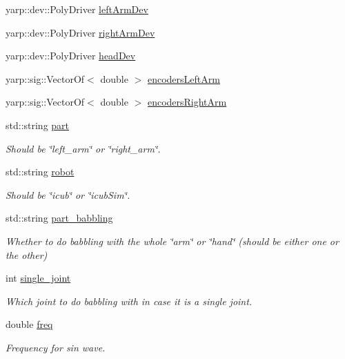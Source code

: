 \begin{DoxyCompactItemize}
\item 
yarp\+::dev\+::\+Poly\+Driver \hyperlink{group__babbling_aa52eea3bfd656e48ed01bce7a7cd9da8}{left\+Arm\+Dev}
\item 
yarp\+::dev\+::\+Poly\+Driver \hyperlink{group__babbling_ab35573fbefffff68d2816c4ce405a0a4}{right\+Arm\+Dev}
\item 
yarp\+::dev\+::\+Poly\+Driver \hyperlink{group__babbling_a1428fa9c9e68fada5155fc79fc7af6dd}{head\+Dev}
\item 
yarp\+::sig\+::\+Vector\+Of$<$ double $>$ \hyperlink{group__babbling_a9ef28388394d078d6578764a6435017c}{encoders\+Left\+Arm}
\item 
yarp\+::sig\+::\+Vector\+Of$<$ double $>$ \hyperlink{group__babbling_ab8d18ae468c969406e3689fc08732430}{encoders\+Right\+Arm}
\item 
std\+::string \hyperlink{group__babbling_a677602f878f4403e2ad99091c86f29a6}{part}
\begin{DoxyCompactList}\small\item\em Should be \char`\"{}left\+\_\+arm\char`\"{} or \char`\"{}right\+\_\+arm\char`\"{}. \end{DoxyCompactList}\item 
std\+::string \hyperlink{group__babbling_a9b705ef5f9e677dab59f274c1582c0fc}{robot}
\begin{DoxyCompactList}\small\item\em Should be \char`\"{}icub\char`\"{} or \char`\"{}icub\+Sim\char`\"{}. \end{DoxyCompactList}\item 
std\+::string \hyperlink{group__babbling_aa881d448117e515a051b8385532c3578}{part\+\_\+babbling}
\begin{DoxyCompactList}\small\item\em Whether to do babbling with the whole \char`\"{}arm\char`\"{} or \char`\"{}hand\char`\"{} (should be either one or the other) \end{DoxyCompactList}\item 
int \hyperlink{group__babbling_a3db3bc9a3171c963c66b268cd8c28f36}{single\+\_\+joint}
\begin{DoxyCompactList}\small\item\em Which joint to do babbling with in case it is a single joint. \end{DoxyCompactList}\item 
double \hyperlink{group__babbling_a48a9e302ed7cc9487963e2588cab2726}{freq}
\begin{DoxyCompactList}\small\item\em Frequency for sin wave. \end{DoxyCompactList}\item 

\end{DoxyCompactItemize}
